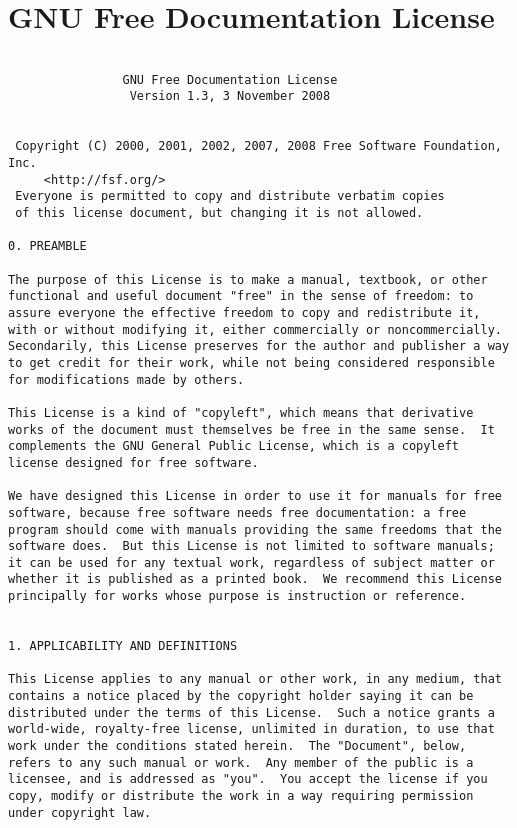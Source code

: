 \documentclass{article}
\begin{document}
\section{GNU Free Documentation License}
\begin{verbatim}

                GNU Free Documentation License
                 Version 1.3, 3 November 2008


 Copyright (C) 2000, 2001, 2002, 2007, 2008 Free Software Foundation, Inc.
     <http://fsf.org/>
 Everyone is permitted to copy and distribute verbatim copies
 of this license document, but changing it is not allowed.

0. PREAMBLE

The purpose of this License is to make a manual, textbook, or other
functional and useful document "free" in the sense of freedom: to
assure everyone the effective freedom to copy and redistribute it,
with or without modifying it, either commercially or noncommercially.
Secondarily, this License preserves for the author and publisher a way
to get credit for their work, while not being considered responsible
for modifications made by others.

This License is a kind of "copyleft", which means that derivative
works of the document must themselves be free in the same sense.  It
complements the GNU General Public License, which is a copyleft
license designed for free software.

We have designed this License in order to use it for manuals for free
software, because free software needs free documentation: a free
program should come with manuals providing the same freedoms that the
software does.  But this License is not limited to software manuals;
it can be used for any textual work, regardless of subject matter or
whether it is published as a printed book.  We recommend this License
principally for works whose purpose is instruction or reference.


1. APPLICABILITY AND DEFINITIONS

This License applies to any manual or other work, in any medium, that
contains a notice placed by the copyright holder saying it can be
distributed under the terms of this License.  Such a notice grants a
world-wide, royalty-free license, unlimited in duration, to use that
work under the conditions stated herein.  The "Document", below,
refers to any such manual or work.  Any member of the public is a
licensee, and is addressed as "you".  You accept the license if you
copy, modify or distribute the work in a way requiring permission
under copyright law.


\end{verbatim}
\end{document}
